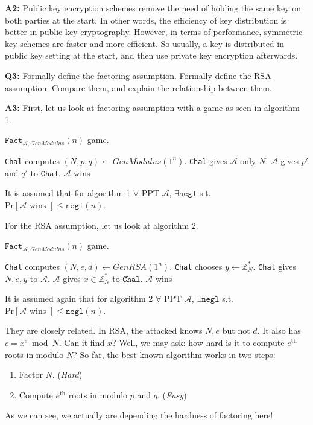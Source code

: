\documentclass[12pt,reqno]{amsart}
\newcommand{\code}[1]{\texttt{#1}}
\newcommand{\advrs}[0]{\mathcal{A}}
\begin{document}
\textbf{A2:} Public key encryption schemes remove the need of holding the same key on both parties at the start. In other words, the efficiency of key distribution is better in public key cryptography. However, in terms of performance, symmetric key schemes are faster and more efficient. So usually, a key is distributed in public key setting at the start, and then use private key encryption afterwards.

\vspace{20px}
\textbf{Q3:} Formally define the factoring assumption. Formally define the RSA assumption. Compare them, and explain the relationship between them.

\textbf{A3:} 
First, let us look at factoring assumption with a game as seen in algorithm 1.
\begin{algorithm}
\caption{$\code{Fact}_{\advrs, GenModulus}(n)$ game.}
\label{alg:1}
\begin{algorithmic}
\STATE \code{Chal} computes $(N, p, q) \gets GenModulus(1^n)$.
\STATE \code{Chal} gives $\advrs$ only $N$.
\STATE $\advrs$ gives $p'$ and $q'$ to $\code{Chal}$.
	\STATE $\advrs$ wins
\ENDIF
\end{algorithmic}
\end{algorithm}
It is assumed that for algorithm 1 $\forall$ PPT $\advrs$, $\exists \code{negl}$ s.t. $\textrm{Pr}[\advrs \textrm{ wins }]\leq \code{negl}(n)$.

For the RSA assumption, let us look at algorithm 2.
\begin{algorithm}
\caption{$\code{Fact}_{\advrs, GenModulus}(n)$ game.}
\label{alg:2}
\begin{algorithmic}
\STATE \code{Chal} computes $(N, e, d) \gets GenRSA(1^n)$.
\STATE \code{Chal} chooses $y \gets \mathbb{Z}_N^*$.
\STATE \code{Chal} gives $N, e, y$ to $\advrs$.
\STATE $\advrs$ gives $x \in \mathbb{Z}_N^*$ to $\code{Chal}$.
	\STATE $\advrs$ wins
\ENDIF
\end{algorithmic}
\end{algorithm}
It is assumed again that for algorithm 2 $\forall$ PPT $\advrs$, $\exists \code{negl}$ s.t. $\textrm{Pr}[\advrs \textrm{ wins }]\leq \code{negl}(n)$.

They are closely related. In RSA, the attacked knows $N, e$ but not $d$. It also has $c = x^e \bmod N$. Can it find $x$? Well, we may ask: how hard is it to compute $e^\textrm{th}$ roots in modulo $N$? So far, the best known algorithm works in two steps:
\begin{enumerate}
\item Factor $N$. (\textit{Hard})
\item Compute $e^\textrm{th}$ roots in modulo $p$ and $q$. (\textit{Easy})
\end{enumerate}
As we can see, we actually are depending the hardness of factoring here!
\end{document}
